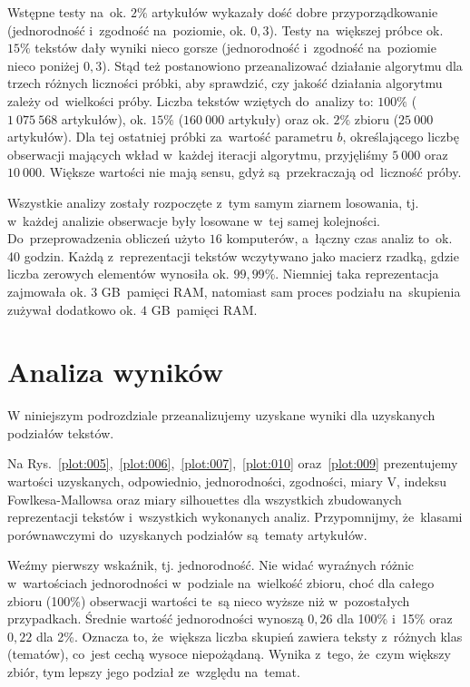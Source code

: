 \documentclass{praca1}
\begin{document}
Wstępne testy na~ok. $2\%$ artykułów wykazały dość dobre przyporządkowanie (jednorodność i~zgodność na~poziomie,  ok. $0{,}3$). Testy na~większej próbce ok. $15\%$ tekstów dały wyniki nieco gorsze (jednorodność i~zgodność na~poziomie nieco poniżej $0{,}3$). Stąd też postanowiono przeanalizować działanie algorytmu dla trzech różnych liczności próbki, aby sprawdzić, czy jakość działania algorytmu zależy od~wielkości próby. Liczba tekstów wziętych do~analizy to: $100\%$ ($1\ 075\ 568$ artykułów), ok. $15\%$ ($160\ 000$ artykuły) oraz ok. $2\%$ zbioru ($25\ 000$ artykułów). Dla tej ostatniej próbki za~wartość parametru $b$, określającego liczbę obserwacji mających wkład w~każdej iteracji algorytmu, przyjęliśmy $5\ 000$ oraz $10\ 000$. Większe wartości nie mają sensu, gdyż są~przekraczają od~liczność próby.

Wszystkie analizy zostały rozpoczęte z~tym samym ziarnem losowania, tj. w~każdej analizie obserwacje były losowane w~tej samej kolejności. Do~przeprowadzenia obliczeń użyto $16$ komputerów, a~łączny czas analiz to~ok. 40 godzin. Każdą z~reprezentacji tekstów wczytywano jako macierz rzadką, gdzie liczba zerowych elementów wynosiła ok. $99{,}99\%$. Niemniej taka reprezentacja zajmowała ok. $3$ GB~pamięci RAM, natomiast sam proces podziału na~skupienia zużywał dodatkowo ok. $4$ GB~pamięci RAM.

\section{Analiza wyników}


W niniejszym podrozdziale przeanalizujemy uzyskane wyniki dla uzyskanych podziałów tekstów.

Na Rys.~\ref{plot:005},~\ref{plot:006},~\ref{plot:007},~\ref{plot:010} oraz~\ref{plot:009} prezentujemy wartości uzyskanych, odpowiednio, jednorodności, zgodności, miary V, indeksu Fowlkesa-Mallowsa oraz miary silhouettes dla wszystkich zbudowanych reprezentacji tekstów i~wszystkich wykonanych analiz. Przypomnijmy, że~klasami porównawczymi do~uzyskanych podziałów są~tematy artykułów.

Weźmy pierwszy wskaźnik, tj. jednorodność. Nie widać wyraźnych różnic w~wartościach jednorodności w~podziale na~wielkość zbioru, choć dla całego zbioru (100\%) obserwacji wartości te~są nieco wyższe niż w~pozostałych przypadkach. Średnie wartość jednorodności wynoszą $0{,}26$ dla 100\% i~15\% oraz $0{,}22$ dla 2\%. Oznacza to, że~większa liczba skupień zawiera teksty z~różnych klas (tematów), co~jest cechą wysoce niepożądaną. Wynika z~tego, że~czym większy zbiór, tym lepszy jego podział ze~względu na~temat.
\end{document}
